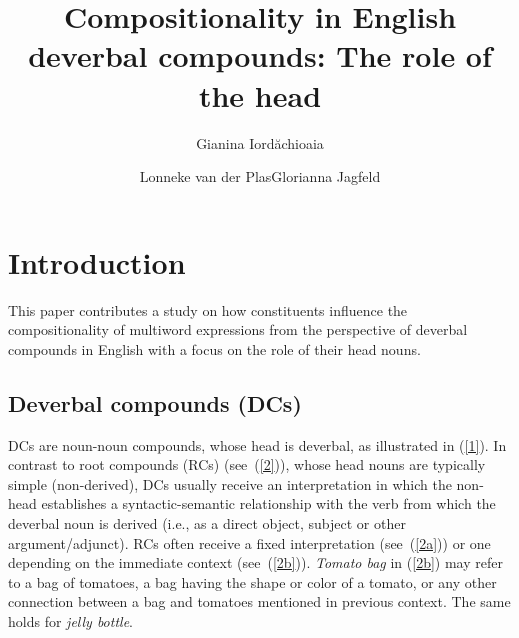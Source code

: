 \documentclass[output=paper]{langsci/langscibook}
\title{Compositionality in English deverbal compounds: The role of the head}
\author{Gianina Iordăchioaia\affiliation{University of Stuttgart}\and Lonneke van der Plas\affiliation{University of Malta}\lastand Glorianna Jagfeld\affiliation{University of Stuttgart}}
\begin{document}
\maketitle

\section{Introduction}\label{sec:intro} 

This paper contributes a study on how constituents influence the compositionality of multiword expressions from the perspective of deverbal compounds in English with a focus on the role of their head nouns. 

\subsection{Deverbal compounds (DCs)}\label{sec:intro:DCs}
DCs are noun-noun compounds, whose head is deverbal, as illustrated in (\ref{1}). In contrast to root compounds (RCs) (see~(\ref{2})), whose head nouns are typically simple (non-derived), DCs usually receive an interpretation in which the non-head establishes a syntactic-semantic relationship with the verb from which the deverbal noun is derived (i.e., as a direct object, subject or other argument/adjunct). RCs often receive a fixed interpretation (see~(\ref{2a})) or one depending on the immediate context (see~(\ref{2b})). \textit{Tomato bag} in (\ref{2b}) may refer to a bag of tomatoes, a bag having the shape or color of a tomato, or any other connection between a bag and tomatoes mentioned in previous context. The same holds for \textit{jelly bottle}.


\begin{exe}
\end{exe}

\begin{exe}
\end{exe}
\end{document}
